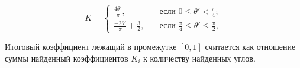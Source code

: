 \begin{equation}
    K = \begin{cases}
        \displaystyle\frac{4\theta'}{\pi}, & \quad \text{если } 0 \leq
        \theta' < \frac{\pi}{4};\\
        \displaystyle\frac{-2\theta'}{\pi} +
        \displaystyle\frac{3}{2},  & \quad \text{если } \frac{\pi}{4} \leq
        \theta' \leq \frac{\pi}{2},
    \end{cases}
\end{equation}

Итоговый коэффициент лежащий в промежутке $[0, 1]$ считается как отношение суммы
найденный коэффициентов $K_i$ к количеству найденных углов.
